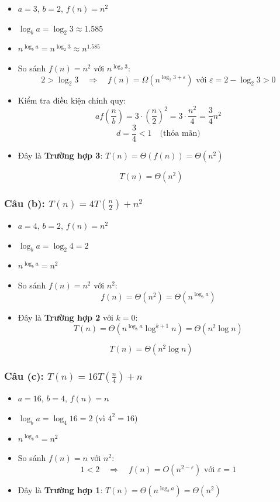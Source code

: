 \documentclass{article}
\begin{document}
\begin{itemize}
    \item \(a = 3\), \(b = 2\), \(f(n) = n^2\)
    \item \(\log_b a = \log_2 3 \approx 1.585\)
    \item \(n^{\log_b a} = n^{\log_2 3} \approx n^{1.585}\)
    \item So sánh \(f(n) = n^2\) với \(n^{\log_2 3}\):
    \[
    2 > \log_2 3 \quad \Rightarrow \quad f(n) = \Omega\left(n^{\log_2 3 + \varepsilon}\right) \text{ với } \varepsilon = 2 - \log_2 3 > 0
    \]
    \item Kiểm tra điều kiện chính quy:
    \[
    a f\left(\frac{n}{b}\right) = 3 \cdot \left(\frac{n}{2}\right)^2 = 3 \cdot \frac{n^2}{4} = \frac{3}{4} n^2
    \]
    \[
    d = \frac{3}{4} < 1 \quad \text{(thỏa mãn)}
    \]
    \item Đây là \textbf{Trường hợp 3}: \(T(n) = \Theta(f(n)) = \Theta(n^2)\)
\end{itemize}

\[
\boxed{T(n) = \Theta(n^2)}
\]

\subsubsection{Câu (b): \( T(n) = 4T\left(\frac{n}{2}\right) + n^2 \)}

\begin{itemize}
    \item \(a = 4\), \(b = 2\), \(f(n) = n^2\)
    \item \(\log_b a = \log_2 4 = 2\)
    \item \(n^{\log_b a} = n^2\)
    \item So sánh \(f(n) = n^2\) với \(n^2\):
    \[
    f(n) = \Theta(n^2) = \Theta(n^{\log_b a})
    \]
    \item Đây là \textbf{Trường hợp 2} với \(k = 0\):
    \[
    T(n) = \Theta(n^{\log_b a} \log^{k+1} n) = \Theta(n^2 \log n)
    \]
\end{itemize}

\[
\boxed{T(n) = \Theta(n^2 \log n)}
\]

\subsubsection{Câu (c): \( T(n) = 16T\left(\frac{n}{4}\right) + n \)}

\begin{itemize}
    \item \(a = 16\), \(b = 4\), \(f(n) = n\)
    \item \(\log_b a = \log_4 16 = 2\) (vì \(4^2 = 16\))
    \item \(n^{\log_b a} = n^2\)
    \item So sánh \(f(n) = n\) với \(n^2\):
    \[
    1 < 2 \quad \Rightarrow \quad f(n) = O\left(n^{2 - \varepsilon}\right) \text{ với } \varepsilon = 1
    \]
    \item Đây là \textbf{Trường hợp 1}: \(T(n) = \Theta(n^{\log_b a}) = \Theta(n^2)\)
\end{itemize}
\end{document}
